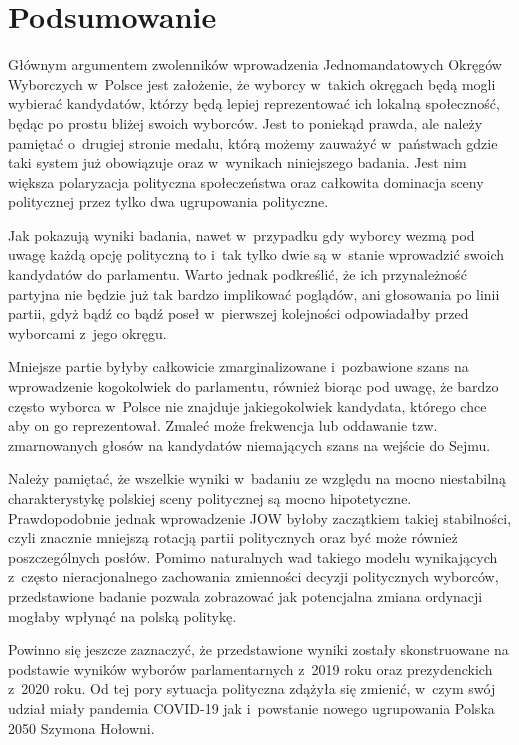 
\def\filename{podsumowanie}

\chapter*{Podsumowanie}\label{ch:podsumowanie}

Głównym argumentem zwolenników wprowadzenia Jednomandatowych Okręgów Wyborczych w~Polsce jest założenie, że wyborcy w~takich okręgach będą mogli wybierać kandydatów, którzy będą lepiej reprezentować ich lokalną społeczność, będąc po prostu bliżej swoich wyborców. Jest to poniekąd prawda, ale należy pamiętać o~drugiej stronie medalu, którą możemy zauważyć w~państwach gdzie taki system już obowiązuje oraz w~wynikach niniejszego badania. Jest nim większa polaryzacja polityczna społeczeństwa oraz całkowita dominacja sceny politycznej przez tylko dwa ugrupowania polityczne.

Jak pokazują wyniki badania, nawet w~przypadku gdy wyborcy wezmą pod uwagę każdą opcję polityczną to i~tak tylko dwie są w~stanie wprowadzić swoich kandydatów do parlamentu. Warto jednak podkreślić, że ich przynależność partyjna nie będzie już tak bardzo implikować poglądów, ani głosowania po linii partii, gdyż bądź co bądź poseł w~pierwszej kolejności odpowiadałby przed wyborcami z~jego okręgu.

Mniejsze partie byłyby całkowicie zmarginalizowane i~pozbawione szans na wprowadzenie kogokolwiek do parlamentu, również biorąc pod uwagę, że bardzo często wyborca w~Polsce nie znajduje jakiegokolwiek kandydata, którego chce aby on go reprezentował. Zmaleć może frekwencja lub oddawanie tzw. zmarnowanych głosów na kandydatów niemających szans na wejście do Sejmu.

Należy pamiętać, że wszelkie wyniki w~badaniu ze względu na mocno niestabilną charakterystykę polskiej sceny politycznej są mocno hipotetyczne. Prawdopodobnie jednak wprowadzenie JOW byłoby zaczątkiem takiej stabilności, czyli znacznie mniejszą rotacją partii politycznych oraz być może również poszczególnych posłów. Pomimo naturalnych wad takiego modelu wynikających z~często nieracjonalnego zachowania zmienności decyzji politycznych wyborców, przedstawione badanie pozwala zobrazować jak potencjalna zmiana ordynacji mogłaby wpłynąć na polską politykę.

Powinno się jeszcze zaznaczyć, że przedstawione wyniki zostały skonstruowane na podstawie wyników wyborów parlamentarnych z~2019 roku oraz prezydenckich z~2020 roku. Od tej pory sytuacja polityczna zdążyła się zmienić, w~czym swój udział miały pandemia COVID-19 jak i~powstanie nowego ugrupowania Polska 2050 Szymona Hołowni.

